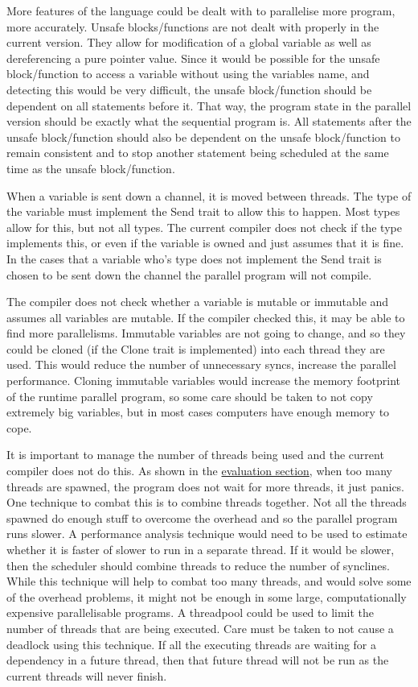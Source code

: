 More features of the language could be dealt with to parallelise more program, more accurately. Unsafe blocks/functions are not dealt with properly in the current version. They allow for modification of a global variable as well as dereferencing a pure pointer value. Since it would be possible for the unsafe block/function to access a variable without using the variables name, and detecting this would be very difficult, the unsafe block/function should be dependent on all statements before it. That way, the program state in the parallel version should be exactly what the sequential program is. All statements after the unsafe block/function should also be dependent on the unsafe block/function to remain consistent and to stop another statement being scheduled at the same time as the unsafe block/function.

When a variable is sent down a channel, it is moved between threads. The type of the variable must implement the Send trait to allow this to happen. Most types allow for this, but not all types. The current compiler does not check if the type implements this, or even if the variable is owned and just assumes that it is fine. In the cases that a variable who's type does not implement the Send trait is chosen to be sent down the channel the parallel program will not compile.

The compiler does not check whether a variable is mutable or immutable and assumes all variables are mutable. If the compiler checked this, it may be able to find more parallelisms. Immutable variables are not going to change, and so they could be cloned (if the Clone trait is implemented) into each thread they are used. This would reduce the number of unnecessary syncs, increase the parallel performance. Cloning immutable variables would increase the memory footprint of the runtime parallel program, so some care should be taken to not copy extremely big variables, but in most cases computers have enough memory to cope.

It is important to manage the number of threads being used and the current compiler does not do this. As shown in the \hyperref[sec:evaluation]{evaluation section}, when too many threads are spawned, the program does not wait for more threads, it just panics. One technique to combat this is to combine threads together. Not all the threads spawned do enough stuff to overcome the overhead and so the parallel program runs slower. A performance analysis technique would need to be used to estimate whether it is faster of slower to run in a separate thread. If it would be slower, then the scheduler should combine threads to reduce the number of synclines. While this technique will help to combat too many threads, and would solve some of the overhead problems, it might not be enough in some large, computationally expensive parallelisable programs. A threadpool could be used to limit the number of threads that are being executed. Care must be taken to not cause a deadlock using this technique. If all the executing threads are waiting for a dependency in a future thread, then that future thread will not be run as the current threads will never finish.

